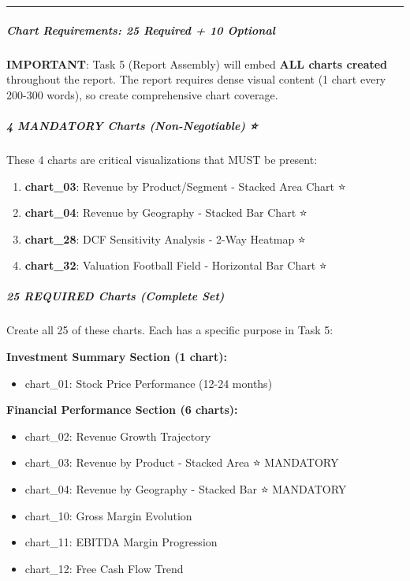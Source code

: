 \documentclass[11pt]{article}
\begin{document}
\vspace{0.5em}\hrule\vspace{0.5em}

\subparagraph{Chart Requirements: 25 Required + 10 Optional}\mbox{}\par

\textbf{IMPORTANT}: Task 5 (Report Assembly) will embed \textbf{ALL charts created} throughout the report. The report requires dense visual content (1 chart every 200-300 words), so create comprehensive chart coverage.


\subparagraph{4 MANDATORY Charts (Non-Negotiable) ⭐}\mbox{}\par

These 4 charts are critical visualizations that MUST be present:


\begin{enumerate}[leftmargin=*,itemsep=2pt,topsep=2pt]
\item {} \textbf{chart\_\allowbreak{}03}: Revenue by Product/Segment - Stacked Area Chart ⭐
\item {} \textbf{chart\_\allowbreak{}04}: Revenue by Geography - Stacked Bar Chart ⭐
\item {} \textbf{chart\_\allowbreak{}28}: DCF Sensitivity Analysis - 2-Way Heatmap ⭐
\item {} \textbf{chart\_\allowbreak{}32}: Valuation Football Field - Horizontal Bar Chart ⭐
\end{enumerate}

\subparagraph{25 REQUIRED Charts (Complete Set)}\mbox{}\par

Create all 25 of these charts. Each has a specific purpose in Task 5:


\textbf{Investment Summary Section (1 chart):}

\begin{itemize}[leftmargin=*,itemsep=2pt,topsep=2pt]
\item {} chart\_\allowbreak{}01: Stock Price Performance (12-24 months)
\end{itemize}

\textbf{Financial Performance Section (6 charts):}

\begin{itemize}[leftmargin=*,itemsep=2pt,topsep=2pt]
\item {} chart\_\allowbreak{}02: Revenue Growth Trajectory
\item {} chart\_\allowbreak{}03: Revenue by Product - Stacked Area ⭐ MANDATORY
\item {} chart\_\allowbreak{}04: Revenue by Geography - Stacked Bar ⭐ MANDATORY
\item {} chart\_\allowbreak{}10: Gross Margin Evolution
\item {} chart\_\allowbreak{}11: EBITDA Margin Progression
\item {} chart\_\allowbreak{}12: Free Cash Flow Trend
\end{itemize}
\end{document}
